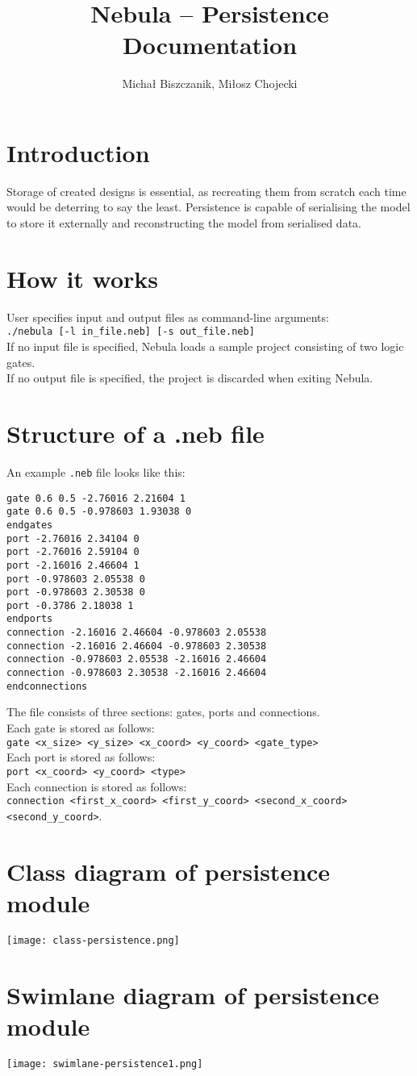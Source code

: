 \documentclass[12pt]{article}
\title{Nebula -- Persistence Documentation}
\author{Michał Biszczanik, Miłosz Chojecki}
\date{}
\begin{document}
\maketitle

\section*{Introduction}

Storage of created designs is essential, as recreating them from scratch each
time would be deterring to say the least. Persistence is capable of
serialising the model to store it externally and reconstructing the model from
serialised data.

\section*{How it works}

User specifies input and output files as command-line arguments: \\
\verb|./nebula [-l in_file.neb] [-s out_file.neb]| \\
If no input file is specified, Nebula loads a sample project consisting of two logic gates. \\
If no output file is specified, the project is discarded when exiting Nebula.

\section*{Structure of a .neb file}

An example \verb|.neb| file looks like this:
\begin{verbatim}
gate 0.6 0.5 -2.76016 2.21604 1
gate 0.6 0.5 -0.978603 1.93038 0
endgates
port -2.76016 2.34104 0
port -2.76016 2.59104 0
port -2.16016 2.46604 1
port -0.978603 2.05538 0
port -0.978603 2.30538 0
port -0.3786 2.18038 1
endports
connection -2.16016 2.46604 -0.978603 2.05538
connection -2.16016 2.46604 -0.978603 2.30538
connection -0.978603 2.05538 -2.16016 2.46604
connection -0.978603 2.30538 -2.16016 2.46604
endconnections
\end{verbatim}

The file consists of three sections: gates, ports and connections. \\
Each gate is stored as follows: \\
\verb|gate <x_size> <y_size> <x_coord> <y_coord> <gate_type>| \\
Each port is stored as follows: \\
\verb|port <x_coord> <y_coord> <type>| \\
Each connection is stored as follows: \\
\verb|connection <first_x_coord> <first_y_coord> <second_x_coord> <second_y_coord>|.

\section*{Class diagram of persistence module}

\texttt{[image: class-persistence.png]}

\section*{Swimlane diagram of persistence module}

\texttt{[image: swimlane-persistence1.png]}
\end{document}
